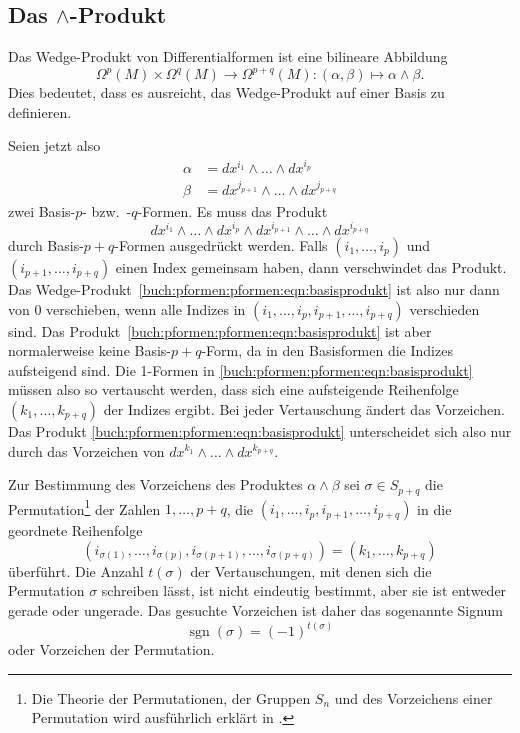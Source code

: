 %
%
\subsection{Das $\wedge$-Produkt}
Das Wedge-Produkt von Differentialformen ist eine bilineare Abbildung
\[
\Omega^p(M)\times \Omega^q(M) \to \Omega^{p+q}(M)
:
(\alpha,\beta) \mapsto \alpha\wedge\beta.
\]
Dies bedeutet, dass es ausreicht, das Wedge-Produkt auf einer Basis
zu definieren.

Seien jetzt also
\begin{align*}
\alpha &= dx^{i_1}\wedge\dots\wedge dx^{i_p} \\
\beta  &= dx^{j_{p+1}}\wedge\dots\wedge dx^{j_{p+q}}
\end{align*}
zwei Basis-$p$- bzw.~-$q$-Formen.
Es muss das Produkt
\begin{equation}
dx^{i_1}\wedge\dots\wedge dx^{i_p}
\wedge
dx^{i_{p+1}}\wedge\dots\wedge dx^{i_{p+q}}
\label{buch:pformen:pformen:eqn:basisprodukt}
\end{equation}
durch Basis-$p+q$-Formen ausgedrückt werden.
Falls $(i_1,\dots,i_p)$ und $(i_{p+1},\dots,i_{p+q})$ einen Index gemeinsam
haben, dann verschwindet das Produkt.
Das Wedge-Produkt~\eqref{buch:pformen:pformen:eqn:basisprodukt}
ist also nur dann von $0$ verschieben, wenn alle Indizes in
$(i_1,\dots,i_p,i_{p+1},\dots,i_{p+q})$ verschieden sind.
Das Produkt~\eqref{buch:pformen:pformen:eqn:basisprodukt} ist aber
normalerweise keine Basis-$p+q$-Form, da in den Basisformen die
Indizes aufsteigend sind.
Die 1-Formen in \eqref{buch:pformen:pformen:eqn:basisprodukt} müssen
also so vertauscht werden, dass sich eine aufsteigende Reihenfolge
$(k_1,\dots,k_{p+q})$
der Indizes ergibt.
Bei jeder Vertauschung ändert das Vorzeichen.
Das Produkt \eqref{buch:pformen:pformen:eqn:basisprodukt} unterscheidet
sich also nur durch das Vorzeichen von 
\(
dx^{k_1}\wedge\dots\wedge dx^{k_{p+q}}
\).

Zur Bestimmung des Vorzeichens des Produktes $\alpha\wedge\beta$ 
sei $\sigma\in S_{p+q}$ die Permutation\footnote{Die Theorie der
Permutationen, der Gruppen $S_n$ und des Vorzeichens einer Permutation
wird ausführlich erklärt in \cite[Abschnitt~4.3.4]{buch:linalg}.}
der Zahlen $1,\dots,p+q$,
die $(i_1,\dots,i_p,i_{p+1},\dots,i_{p+q})$ in die geordnete
Reihenfolge
\[
(i_{\sigma(1)},\dots,i_{\sigma(p)},i_{\sigma(p+1)},\dots,i_{\sigma(p+q)})
=
(k_1,\dots,k_{p+q})
\]
überführt.
Die Anzahl $t(\sigma)$ der Vertauschungen, mit denen sich die
Permutation $\sigma$ schreiben lässt, ist nicht eindeutig bestimmt,
aber sie ist entweder gerade oder ungerade.
Das gesuchte Vorzeichen ist daher das sogenannte Signum
\[
\operatorname{sgn}(\sigma) = (-1)^{t(\sigma)}
\]
oder Vorzeichen der Permutation.

